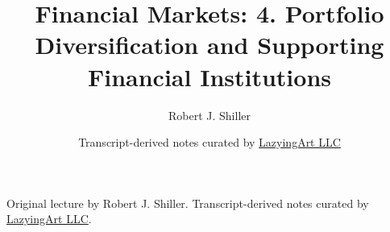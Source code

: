 \documentclass[11pt,oneside]{book}
\begin{document}
\frontmatter
\title{Financial Markets: 4. Portfolio Diversification and Supporting Financial Institutions}
\author{Robert J. Shiller}
\date{Transcript-derived notes curated by \href{https://lazying.art}{LazyingArt LLC}}
\maketitle
\begin{center}
\small Original lecture by Robert J. Shiller. Transcript-derived notes curated by \href{https://lazying.art}{LazyingArt LLC}.
\end{center}
\clearpage
\mainmatter

\end{document}
